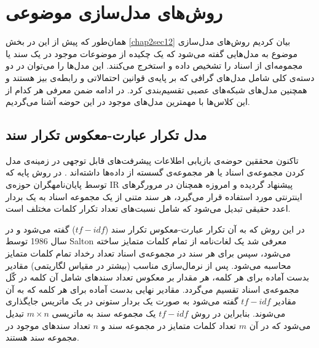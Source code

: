 \section{روش‌های مدل‌سازی موضوعی}
\label{chap3sec3}
همان‌طور که پیش از این در بخش
\ref{chap2sec12}
بیان کردیم روش‌های مدل‌سازی موضوع به مدل‌هایی گفته می‌‌شود که یک چکیده از موضوعات موجود در یک سند یا مجمومه‌ای از اسناد را تشخیص داده و استخرج می‌‌کنند. این مدل‌ها را می‌‌توان در دو دسته‌ی کلی‌ شامل مدل‌های گرافی که بر پایه‌ی قوانین احتمالاتی و رابطه‌‌ی بیز هستند و همچنین مدل‌های شبکه‌های عصبی تقسیم‌بندی کرد. در ادامه ضمن معرفی هر کدام از این کلاس‌ها با مهمترین مدل‌های موجود در این حوضه آشنا می‌‌گردیم.
	\subsection{مدل تکرار عبارت-معکوس تکرار سند}
	\label{chap3sec3sub1}
	 تاکنون محققین حوضه‌ی بازیابی اطلاعات پیشرفت‌های قابل توجهی‌ در زمینه‌ی مدل کردن مجموعه‌ی اسناد یا هر مجموعه‌ی گسسته‌ از داده‌ها داشته‌اند
	\cite{baeza1999modern}.
	در روش پایه که توسط پایان‌‌نامهگران حوزه‌ی
	IR
	پیشنهاد گردیده و امروزه همچنان در مرورگر‌های اینترنتی مورد استفاده قرار می‌‌گیرد، هر سند متنی از یک مجموعه اسناد به یک بردار اعدد حقیقی‌ تبدیل می‌شود که شامل نسبت‌های تعداد تکرار کلمات مختلف است.
	
	 در این روش که به آن تکرار عبارت-معکوس تکرار سند 
	($tf-idf$) \cite{salton1986introduction}
	گفته می‌شود و در سال 1986 توسط
	Salton
	معرفی شد یک لغات‌نامه از تمام کلمات متمایز ساخته می‌‌شود، سپس برای هر سند در مجموعه‌ی اسناد تعداد رخداد تمام کلمات متمایز محاسبه می‌‌شود. پس از نرمال‌سازی مناسب (بیشتر در مقیاس لگاریتمی) مقادیر بدست آماده برای هر کلمه، هر مقدار بر معکوس تعداد سندهای شامل آن کلمه در کّل مجموعه‌ی اسناد تقسیم می‌‌گردد. مقادیر نهایی بدست آماده برای هر کلمه که به آن مقادیر
	$tf-idf$
	گفته می‌شود به صورت یک بردار ستونی در یک ماتریس جایگذاری می‌شوند. بنابراین در روش
	$tf-idf$
	یک مجموعه سند به ماتریسی
	$m \times n$
	تبدیل می‌شود که در آن
	$m$
	تعداد کلمات متمایز در مجموعه سند و
	$n$
	تعداد سندهای موجود در مجموعه سند هستند.
	

